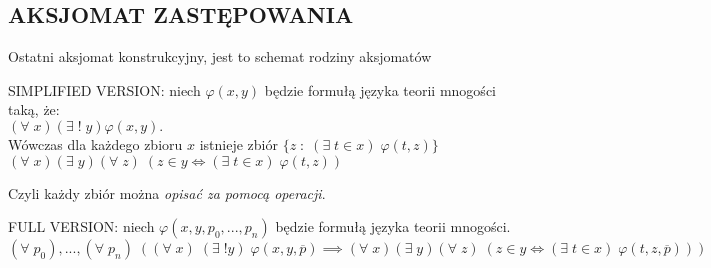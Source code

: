 \subsection{AKSJOMAT ZASTĘPOWANIA}
Ostatni aksjomat konstrukcyjny, jest to schemat rodziny aksjomatów\smallskip\\
\begin{center}\large
    {\color{def}SIMPLIFIED VERSION:} niech $\varphi(x, y)$ będzie formułą języka teorii mnogości taką, że:\smallskip\\
    $(\forall\;x)(\exists\;!\;y)\varphi(x, y).$\smallskip\\
    Wówczas dla każdego zbioru $x$ istnieje zbiór $\{z\;:\;(\exists\;t\in x)\;\varphi(t, z)\}$\smallskip\\
    $(\forall\;x)(\exists\;y)(\forall\;z)\;(z\in y\iff (\exists\;t\in x)\;\varphi(t, z))$
\end{center}\medskip
Czyli każdy zbiór można \emph{\color{acc}opisać za pomocą operacji}.\bigskip\\
\begin{center}\large
    {\color{def}FULL VERSION:} niech $\varphi(x, y, p_0, ..., p_n)$ będzie formułą języka teorii mnogości. \smallskip\\
    $(\forall\;p_0), ..., (\forall\;p_n)\;((\forall\;x)\;(\exists\;!y)\;\varphi(x, y, \overline p)\implies (\forall\;x)(\exists\;y)(\forall\;z)\;(z\in y\iff (\exists\;t\in x)\;\varphi(t, z, \overline p)))$
\end{center}

